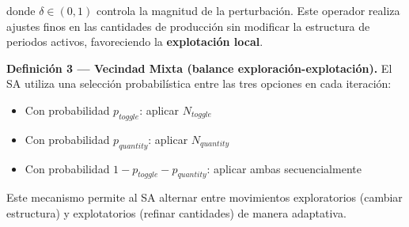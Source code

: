 \documentclass[
  spanish,
  12pt,
]{article}
\providecommand{\tightlist}{%
  \setlength{\itemsep}{0pt}\setlength{\parskip}{0pt}}
\begin{document}
donde \(\delta \in (0, 1)\) controla la magnitud de la perturbación.
Este operador realiza ajustes finos en las cantidades de producción sin
modificar la estructura de periodos activos, favoreciendo la
\textbf{explotación local}.

\textbf{Definición 3 --- Vecindad Mixta (balance
exploración-explotación).} El SA utiliza una selección probabilística
entre las tres opciones en cada iteración:

\begin{itemize}
\tightlist
\item
  Con probabilidad \(p_{toggle}\): aplicar \(N_{toggle}\)
\item
  Con probabilidad \(p_{quantity}\): aplicar \(N_{quantity}\)
\item
  Con probabilidad \(1 - p_{toggle} - p_{quantity}\): aplicar ambas
  secuencialmente
\end{itemize}

Este mecanismo permite al SA alternar entre movimientos exploratorios
(cambiar estructura) y explotatorios (refinar cantidades) de manera
adaptativa.
\end{document}
